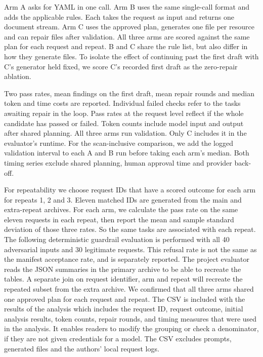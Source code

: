 \documentclass[12pt,onecolumn,draftclsnofoot]{IEEEtran}
\begin{document}
Arm A asks for YAML in one call. Arm B uses the same single-call format and adds the applicable rules. Each takes the request as input and returns one document stream. Arm C uses the approved plan, generates one file per resource and can repair files after validation. All three arms are scored against the same plan for each request and repeat. B and C share the rule list, but also differ in how they generate files. To isolate the effect of continuing past the first draft with C's generator held fixed, we score C's recorded first draft as the zero-repair ablation.

Two pass rates, mean findings on the first draft, mean repair rounds and median token and time costs are reported. Individual failed checks refer to the tasks awaiting repair in the loop. Pass rates at the request level reflect if the whole candidate has passed or failed. Token counts include model input and output after shared planning. All three arms run validation. Only C includes it in the evaluator's runtime. For the scan-inclusive comparison, we add the logged validation interval to each A and B run before taking each arm's median. Both timing series exclude shared planning, human approval time and provider back-off.

For repeatability we choose request IDs that have a scored outcome for each arm for repeats 1, 2 and 3. Eleven matched IDs are generated from the main and extra-repeat archives. For each arm, we calculate the pass rate on the same eleven requests in each repeat, then report the mean and sample standard deviation of those three rates. So the same tasks are associated with each repeat. The following deterministic guardrail evaluation is performed with all 40 adversarial inputs and 30 legitimate requests. This refusal rate is not the same as the manifest acceptance rate, and is separately reported. The project evaluator reads the JSON summaries in the primary archive to be able to recreate the tables. A separate join on request identifier, arm and repeat will recreate the repeated subset from the extra archive. We confirmed that all three arms shared one approved plan for each request and repeat. The CSV is included with the results of the analysis which includes the request ID, request outcome, initial analysis results, token counts, repair rounds, and timing measures that were used in the analysis. It enables readers to modify the grouping or check a denominator, if they are not given credentials for a model. The CSV excludes prompts, generated files and the authors' local request logs.
\end{document}
